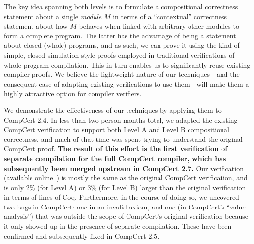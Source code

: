 The key idea spanning both levels is to formulate a compositional correctness statement about a
single \emph{module} $M$ in terms of a ``contextual'' correctness statement about how $M$ behaves
when linked with arbitrary other modules to form a complete program.  The latter has the advantage
of being a statement about closed (whole) programs, and as such, we can prove it using the kind of
simple, closed-simulation-style proofs employed in traditional verifications of whole-program
compilation.  This in turn enables us to significantly reuse existing compiler proofs.  We believe
the lightweight nature of our techniques---and the consequent ease of adapting existing
verifications to use them---will make them a highly attractive option for compiler verifiers.

We demonstrate the effectiveness of our techniques by applying them to CompCert 2.4.  In less than
two person-months total, we adapted the existing CompCert verification to support both Level A and
Level B compositional correctness, and much of that time was spent trying to understand the original
CompCert proof.  \textbf{The result of this effort is the first verification of separate compilation
  for the full CompCert compiler, which has subsequently been merged upstream in CompCert 2.7.}  Our
verification (available online~\cite{kang-phd-thesis-web}) is mostly the same as the original
CompCert verification, and is only 2\% (for Level A) or 3\% (for Level B) larger than the original
verification in terms of lines of Coq.  Furthermore, in the course of doing so, we uncovered two
bugs in CompCert: one in an invalid axiom, and one (in CompCert's ``value analysis'') that was
outside the scope of CompCert's original verification because it only showed up in the presence of
separate compilation.  These have been confirmed and subsequently fixed in CompCert 2.5.





